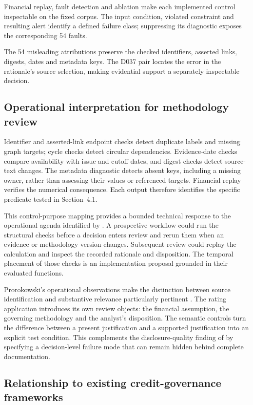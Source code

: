 \documentclass[11pt,a4paper]{article}
\begin{document}
Financial replay, fault detection and ablation make each implemented control inspectable on the fixed corpus. The input condition, violated constraint and resulting alert identify a defined failure class; suppressing its diagnostic exposes the corresponding 54 faults.

The 54 misleading attributions preserve the checked identifiers, asserted links, digests, dates and metadata keys. The D037 pair locates the error in the rationale's source selection, making evidential support a separately inspectable decision.

\subsection{Operational interpretation for methodology review}

Identifier and asserted-link endpoint checks detect duplicate labels and missing graph targets; cycle checks detect circular dependencies. Evidence-date checks compare availability with issue and cutoff dates, and digest checks detect source-text changes. The metadata diagnostic detects absent keys, including a missing owner, rather than assessing their values or referenced targets. Financial replay verifies the numerical consequence. Each output therefore identifies the specific predicate tested in Section~4.1.

This control-purpose mapping provides a bounded technical response to the operational agenda identified by \citet{castro2026}. A prospective workflow could run the structural checks before a decision enters review and rerun them when an evidence or methodology version changes. Subsequent review could replay the calculation and inspect the recorded rationale and disposition. The temporal placement of those checks is an implementation proposal grounded in their evaluated functions.

Prorokowski's operational observations make the distinction between source identification and substantive relevance particularly pertinent \citep{prorokowski2026}. The rating application introduces its own review objects: the financial assumption, the governing methodology and the analyst's disposition. The semantic controls turn the difference between a present justification and a supported justification into an explicit test condition. This complements the disclosure-quality finding of \citet{roncato2026} by specifying a decision-level failure mode that can remain hidden behind complete documentation.

\subsection{Relationship to existing credit-governance frameworks}
\end{document}
